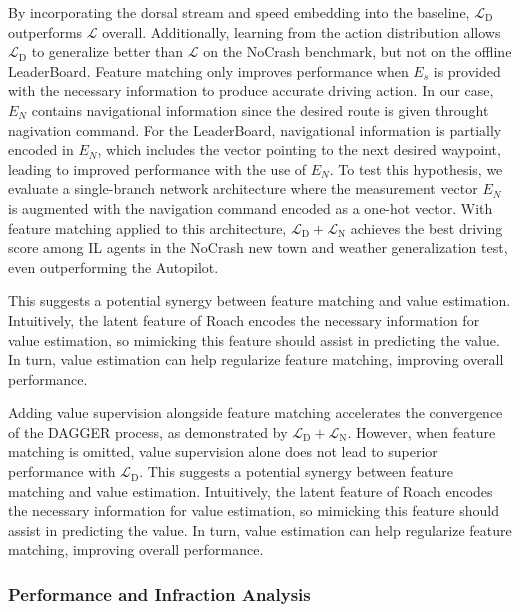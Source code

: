 By incorporating the dorsal stream and speed embedding into the baseline, $\mathcal{L}_\text{D}$ outperforms $\mathcal{L}$ overall.
Additionally, learning from the action distribution allows $\mathcal{L}_\text{D}$ to generalize better than $\mathcal{L}$ on the NoCrash benchmark, but not on the offline LeaderBoard.
Feature matching only improves performance when $E_s$ is provided with the necessary information to produce accurate driving action.
In our case, $E_N$ contains navigational information since the desired route is given throught nagivation command.
For the LeaderBoard, navigational information is partially encoded in $E_N$, which includes the vector pointing to the next desired waypoint, leading to improved performance with the use of $E_N$.
To test this hypothesis, we evaluate a single-branch network architecture where the measurement vector $E_N$ is augmented with the navigation command encoded as a one-hot vector.
With feature matching applied to this architecture, $\mathcal{L}_\text{D} + \mathcal{L}_\text{N}$ achieves the best driving score among IL agents in the NoCrash new town and weather generalization test, even outperforming the Autopilot.



This suggests a potential synergy between feature matching and value estimation. Intuitively, the latent feature of Roach encodes the necessary information for value estimation, so mimicking this feature should assist in predicting the value. In turn, value estimation can help regularize feature matching, improving overall performance.

Adding value supervision alongside feature matching accelerates the convergence of the DAGGER process, as demonstrated by $\mathcal{L}_\text{D} + \mathcal{L}_\text{N}$.
However, when feature matching is omitted, value supervision alone does not lead to superior performance with $\mathcal{L}_\text{D}$.
This suggests a potential synergy between feature matching and value estimation. 
Intuitively, the latent feature of Roach encodes the necessary information for value estimation, so mimicking this feature should assist in predicting the value. 
In turn, value estimation can help regularize feature matching, improving overall performance.


\subsubsection{Performance and Infraction Analysis}


